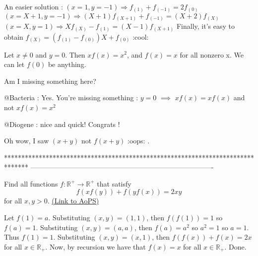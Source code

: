 \begin{solution}
	An easier solution :   
$ (x=1,y=-1) \Longrightarrow f_{(1)}+f_{(-1)}=2f_{(0)}$
$ (x= X+1,y=-1)\Longrightarrow (X+1)f_{(X+1)}+f_{(-1)}=(X+2)f_{(X)}$
$ (x=X,y=1) \Longrightarrow Xf_{(X)}-f_{(1)}=(X-1)f_{(X+1)}$
Finally, it's easy to obtain $ f_{(X)}= (f_{(1)}-f_{(0)})X + f_{(0)}$
 :cool:
\end{solution}



\begin{solution}
	Let $ x \neq0$ and $ y=0$. Then $ x f(x)=x^2$, and $ f(x)=x$ for all nonzero x. We can let $ f(0)$ be anything.

Am I missing something here?
\end{solution}



\begin{solution}
	@Bacteria : Yes. You're missing something : $ y=0$ $ \implies$ $ xf(x)=xf(x)$ and not $ xf(x)=x^2$


@Diogene : nice and quick! Congrats !
\end{solution}



\begin{solution}
	Oh wow, I saw $ (x+y)$ not $ f(x+y)$  :oops: .
\end{solution}
*******************************************************************************
-------------------------------------------------------------------------------

\begin{problem}
	Find all functions $f: \mathbb R^{+} \to \mathbb R^{+}$ that satisfy \[ f(xf(y))+f(yf(x))=2xy\] for all $x,y >0$.
	\flushright \href{https://artofproblemsolving.com/community/c6h312394}{(Link to AoPS)}
\end{problem}



\begin{solution}
	Let $ f(1)=a$.
Substituting $ (x,y)=(1,1)$, then $ f(f(1))=1$ so $ f(a)=1$.
Substituting $ (x,y)=(a,a)$, then $ f(a)=a^2$ so $ a^2=1$ so $ a=1$.
Thus $ f(1)=1$.
Substituting $ (x,y)=(x,1)$, then $ f(f(x))+f(x)=2x$ for all $ x \in \mathbb{R}_+$.
Now, by recursion we have that $ f(x)=x$ for all $ x \in \mathbb{R}_+$.
Done.
\end{solution}



